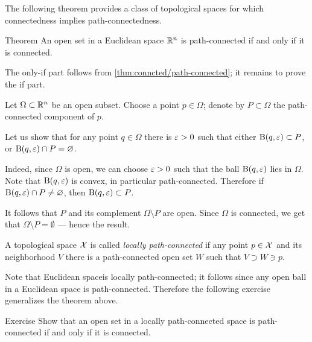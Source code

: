 The following theorem provides a class of topological spaces for which connectedness implies path-connectedness.

\begin{thm}{Theorem}\label{thm:open-connected=path-connected}
An open set in a Euclidean space $\mathbb{R}^n$ is path-connected if and only if it is connected.
\end{thm}

The only-if part follows from \ref{thm:conncted/path-connected};
it remains to prove the if part.

Let $\Omega\subset\mathbb{R}^n$ be an open subset.
Choose a point $p\in\Omega$; denote by $P\subset \Omega$ the path-connected component of $p$.

Let us show that for any point $q\in \Omega$ there is $\varepsilon>0$ such that either $\mathrm{B}(q,\varepsilon)\subset P$, or $\mathrm{B}(q,\varepsilon)\cap P=\varnothing$.

Indeed, since $\Omega$ is open, we can choose $\varepsilon>0$ such that the ball $\mathrm{B}(q,\varepsilon)$ lies in $\Omega$.
Note that $\mathrm{B}(q,\varepsilon)$ is convex, in particular path-connected.
Therefore if $\mathrm{B}(q,\varepsilon)\cap P\ne\varnothing$, then $\mathrm{B}(q,\varepsilon)\subset P$.

It follows that $P$ and its complement $\Omega\setminus P$ are open.
Since $\Omega$ is connected, we get that $\Omega\setminus P=\emptyset$ --- hence the result.
\qeds

A topological space $\mathcal{X}$ is called \emph{locally path-connected} if any point $p\in\mathcal{X}$ and its neighborhood $V$ there is a path-connected open set $W$ such that $V\supset W\ni p$. 

Note that Euclidean spaceis locally path-connected;
it follows since any open ball in a Euclidean space is path-connected.
Therefore the following exercise generalizes the theorem above.

\begin{thm}{Exercise}\label{ex:locally-path-connected}
Show that an open set in a locally path-connected space is path-connected if and only if it is connected.
\end{thm}

